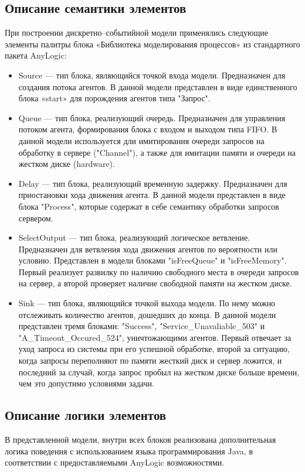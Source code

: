 \subsection{Описание семантики элементов}
При построении дискретно--событийной модели применялись следующие
элементы палитры блока «Библиотека моделирования процессов» из стандартного
пакета AnyLogic:
\begin{itemize}
    \item Source –-- тип блока, являющийся точкой входа модели. Предназначен для
    создания потока агентов. В данной модели представлен в виде единственного
    блока «start» для порождения агентов типа "Запрос".
    \item Queue –-- тип блока, реализующий очередь. Предназначен для управления
    потоком агента, формирования блока с входом и выходом типа FIFO. В
    данной модели используется дли имитирования очереди запросов на
    обработку в сервере ("Channel"), а также для имитации памяти и очереди на жестком
    диске (hardware).
    \item Delay –-- тип блока, реализующий временную задержку. Предназначен для
    приостановки хода движения агента. В данной модели представлен в виде
    блока "Process", которые содержат в себе семантику обработки запросов
    сервером.
    \item SelectOutput --- тип блока, реализующий логическое ветвление.
    Предназначен для ветвления хода движения агентов по вероятности или
    условию. Представлен в модели блоками "isFreeQueue" и "isFreeMemory".
    Первый реализует развилку по наличию свободного места в очереди запросов на сервер,
    а второй проверяет наличие свободной памяти на жестком диске.
    \item Sink –-- тип блока, являющийся точкой выхода модели. По нему можно
    отслеживать количество агентов, дошедших до конца. В данной модели
    представлен тремя блоками: "Success", "Service\_Unavaliable\_503" и
    "A\_Timeout\_Occured\_524", уничтожающими агентов. Первый отвечает за уход запроса из системы при его
    успешной обработке, второй за ситуацию, когда запросы переполняют по памяти жесткий диск и
    сервер ложится, и последний за случай, когда запрос пробыл на жестком диске больше времени, чем это
    допустимо условиями задачи.
\end{itemize}

\subsection{Описание логики элементов}
В представленной модели, внутри всех блоков реализована дополнительная логика поведения
с использованием языка программирования Java, в соответствии с предоставляемыми AnyLogic
возможностями.

